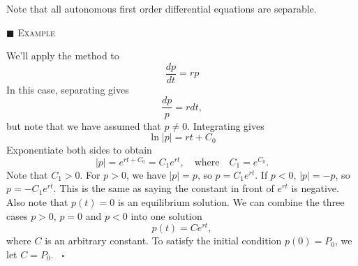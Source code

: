 \documentclass[reqno]{immbook}
\numberwithin{equation}{chapter}
\numberwithin{question}{section}
\numberwithin{theorem}{chapter}
\numberwithin{figure}{chapter}
\theoremstyle{definition}
\newenvironment{xexample}%
{%

\medskip\noindent\addtocounter{example}{1}$\blacksquare$ \textsc{Example \theexample}\hspace*{1em}%
}%
{%
~\hfill$\square$

\medskip
}
\begin{document}
Note that all autonomous first order differential equations are separable.

\begin{xexample}
We'll apply the method to
\begin{equation}
   \frac{dp}{dt} = r p
\end{equation}
In this case, separating gives
\begin{equation}
   \frac{dp}{p} = r dt,
\end{equation}
but note that we have assumed that $p\ne 0$.
Integrating gives
\begin{equation}
   \ln | p | = rt+C_0
\end{equation}
Exponentiate both sides to obtain
\begin{equation}
  |p| = e^{rt+C_0} = C_1e^{rt}, \quad \textrm{where} \quad C_1 = e^{C_0}.
\end{equation}
Note that $C_1 > 0$.
For $p > 0$, we have $|p|=p$, so $p=C_1e^{rt}$.
If $p < 0$, $|p| = -p$, so $p = -C_1e^{rt}$.
This is the same as saying the constant in front of $e^{rt}$ is negative.
Also note that $p(t)=0$ is an equilibrium solution.
We can combine the three cases $p>0$, $p=0$ and $p<0$ into one
solution
\begin{equation}
   p(t) = Ce^{rt},
\end{equation}
where $C$ is an arbitrary constant.
To satisfy the initial condition $p(0)=P_0$, we let $C=P_0$.
\end{xexample}
\end{document}
